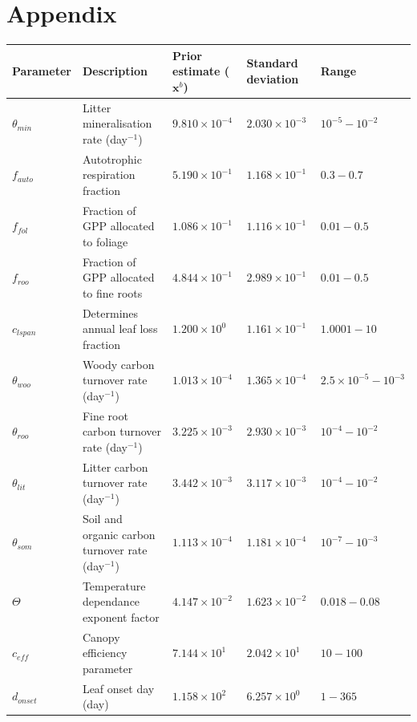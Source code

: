 \newpage

\section{Appendix}

\begin{table}[ht] 
\begin{center}
\scriptsize
	\begin{tabular}{| l | p{4.5cm} | p{1.7cm} | p{1.7cm} | p{1.7cm} |}
	\hline
	Parameter & Description & Prior estimate ($\textbf{x}^{b}$) & Standard deviation & Range \\ \hline
$\theta_{min}$ & Litter mineralisation rate (day$^{-1}$) & $9.810\times 10^{-4}$ & $2.030\times 10^{-3}$ & $10^{-5} - 10^{-2}$ \\ \hline
$f_{auto}$ & Autotrophic respiration fraction & $5.190\times 10^{-1}$ & $1.168\times 10^{-1}$ & $0.3 - 0.7$  \\ \hline
$f_{fol}$ & Fraction of GPP allocated to foliage & $1.086\times 10^{-1}$ & $1.116\times 10^{-1}$ & $0.01-0.5$ \\ \hline
$f_{roo}$ & Fraction of GPP allocated to fine roots & $4.844\times 10^{-1}$ & $2.989\times 10^{-1}$ & $0.01-0.5$ \\ \hline
$c_{lspan}$ & Determines annual leaf loss fraction & $1.200\times 10^{0} $ & $1.161\times 10^{-1}$ & $1.0001 - 10$ \\ \hline
$\theta_{woo}$ & Woody carbon turnover rate (day$^{-1}$) & $1.013\times 10^{-4}$ & $1.365\times 10^{-4}$ & $2.5\times10^{-5} - 10^{-3}$ \\ \hline
$\theta_{roo}$ & Fine root carbon turnover rate (day$^{-1}$) & $3.225\times 10^{-3}$ & $2.930\times 10^{-3}$ & $10^{-4} - 10^{-2}$ \\ \hline
$\theta_{lit}$ & Litter carbon turnover rate (day$^{-1}$) & $3.442\times 10^{-3}$ & $3.117\times 10^{-3}$ & $10^{-4} - 10^{-2}$ \\ \hline
$\theta_{som}$ & Soil and organic carbon turnover rate (day$^{-1}$) & $1.113\times 10^{-4}$ & $1.181\times 10^{-4}$ & $10^{-7} - 10^{-3}$ \\ \hline
$\Theta$ & Temperature dependance exponent factor & $4.147\times 10^{-2}$ & $1.623\times 10^{-2}$ & $0.018 - 0.08$ \\ \hline
$c_{eff}$ & Canopy efficiency parameter & $7.144\times 10^{1}$ & $2.042\times 10^{1}$ & $10 - 100$ \\ \hline
$d_{onset}$ & Leaf onset day (day) & $1.158\times 10^{2}$ & $6.257\times 10^{0}$ & $1 - 365$ \\ \hline

\end{tabular}
\end{center}
\end{table}
